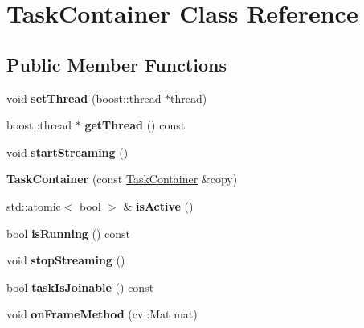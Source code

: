 \hypertarget{class_task_container}{}\section{Task\+Container Class Reference}
\label{class_task_container}
\subsection*{Public Member Functions}
\begin{DoxyCompactItemize}
\item 
\mbox{\label{class_task_container_a81261ca00c3cd4d4c19f08abd6ea0ec3}} 
void {\bfseries set\+Thread} (boost\+::thread $\ast$thread)
\item 
\mbox{\label{class_task_container_a67d9569d8e0993abc1a4c2a111e8a0e8}} 
boost\+::thread $\ast$ {\bfseries get\+Thread} () const
\item 
\mbox{\label{class_task_container_a10224c7de9381e64bbd909850435f5e4}} 
void {\bfseries start\+Streaming} ()
\item 
\mbox{\label{class_task_container_ad58112f21d7d3a5d569561ba9e85da62}} 
{\bfseries Task\+Container} (const \hyperlink{class_task_container}{Task\+Container} \&copy)
\item 
\mbox{\label{class_task_container_a3eb5cfdae14fe31a4052c48efa71aaad}} 
std\+::atomic$<$ bool $>$ \& {\bfseries is\+Active} ()
\item 
\mbox{\label{class_task_container_aa91962750f424fc4cadd845701a469cd}} 
bool {\bfseries is\+Running} () const
\item 
\mbox{\label{class_task_container_aab4b0d8ecbebe3e9b090f009c0ed48cb}} 
void {\bfseries stop\+Streaming} ()
\item 
\mbox{\label{class_task_container_aedfe7447f30fd3729d19ff8e632a234a}} 
bool {\bfseries task\+Is\+Joinable} () const
\item 
\mbox{\label{class_task_container_ac351f371bd07a9ef835b24951cd63c0a}} 
void {\bfseries on\+Frame\+Method} (cv\+::\+Mat mat)
\end{DoxyCompactItemize}

